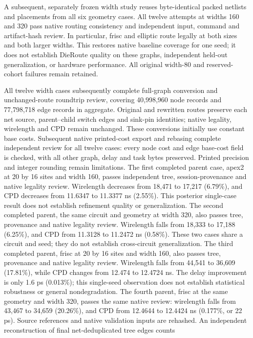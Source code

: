 \documentclass[10pt]{article}
\begin{document}
A subsequent, separately frozen width study reuses byte-identical packed
netlists and placements from all six geometry cases. All twelve attempts
at widths 160 and 320 pass native routing consistency and independent
input, command and artifact-hash review. In particular, frisc and elliptic
route legally at both sizes and both larger widths. This restores native
baseline coverage for one seed; it does not establish DieRoute quality on
these graphs, independent held-out generalization, or hardware performance.
All original width-80 and reserved-cohort failures remain retained.

All twelve width cases subsequently complete full-graph conversion and
unchanged-route roundtrip review, covering 40,998,960 node records and
77,798,718 edge records in aggregate. Original and rewritten routes preserve
each net source, parent--child switch edges and sink-pin identities; native
legality, wirelength and CPD remain unchanged. These conversions initially
use constant base costs. Subsequent native printed-cost export and rebasing
complete independent review for all twelve cases: every node cost and edge
base-cost field is checked, with all other graph, delay and task bytes
preserved. Printed precision and integer rounding remain limitations.
The first completed parent case, apex2 at 20 by 16 sites and width 160,
passes independent tree, session-provenance and native legality review.
Wirelength decreases from 18,471 to 17,217 (6.79\%), and CPD decreases from
11.6347 to 11.3377 ns (2.55\%). This posterior single-case result does not
establish refinement quality or generalization.
The second completed parent, the same circuit and geometry at width 320,
also passes tree, provenance and native legality review. Wirelength falls
from 18,333 to 17,188 (6.25\%), and CPD from 11.3128 to 11.2472 ns
(0.58\%). These two cases share a circuit and seed; they do not establish
cross-circuit generalization. The third completed parent, frisc at 20 by 16
sites and width 160, also passes tree, provenance and native legality review.
Wirelength falls from 44,541 to 36,609 (17.81\%), while CPD changes from
12.474 to 12.4724 ns. The delay improvement is only 1.6 ps (0.013\%);
this single-seed observation does not establish statistical robustness
or general nondegradation. The fourth parent,
frisc at the same geometry and width 320, passes the same native review:
wirelength falls from 43,467 to 34,659 (20.26\%), and CPD from 12.4644
to 12.4424 ns (0.177\%, or 22 ps). Source references and native validation
inputs are rehashed. An independent reconstruction of final net-deduplicated tree edges counts
\end{document}
